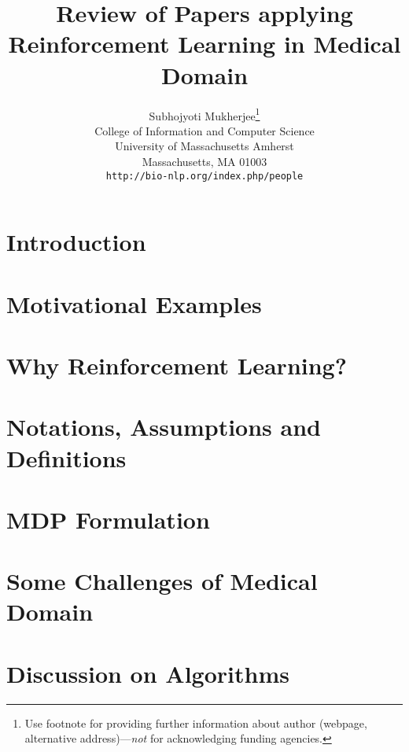 \documentclass{article}
\title{Review of Papers applying Reinforcement Learning in Medical Domain}
\author{
  Subhojyoti Mukherjee\thanks{Use footnote for providing further
    information about author (webpage, alternative
    address)---\emph{not} for acknowledging funding agencies.} \\
  College of Information and Computer Science\\
  University of Massachusetts Amherst\\
  Massachusetts, MA 01003 \\
  \texttt{http://bio-nlp.org/index.php/people} \\
}
\begin{document}

\maketitle





\section{Introduction}
\label{review:intro}


\section{Motivational Examples}
\label{review:motivation}


\section{Why Reinforcement Learning?}
\label{review:whyRL}


%


\section{Notations, Assumptions and Definitions}
\label{review:notations}



\section{MDP Formulation}
\label{review:mdp}


\section{Some Challenges of Medical Domain}
\label{review:complexity}


\section{Discussion on Algorithms}
\label{review:algorithm}

\end{document}
